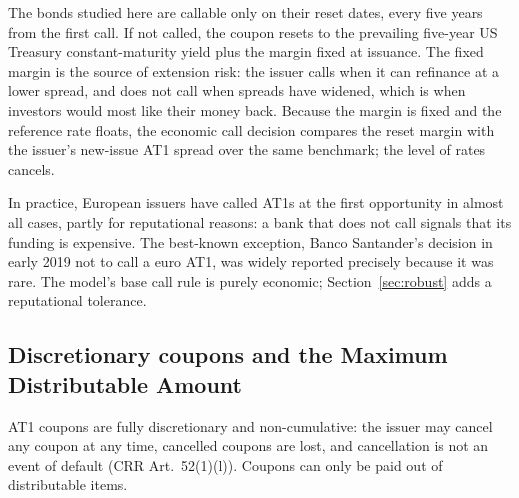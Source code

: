 The bonds studied here are callable only on their reset dates, every five years from
the first call. If not called, the coupon resets to the prevailing five-year US
Treasury constant-maturity yield plus the margin fixed at issuance. The fixed margin is
the source of extension risk: the issuer calls when it can refinance at a lower spread,
and does not call when spreads have widened, which is when investors would most like
their money back. Because the margin is fixed and the reference rate floats, the
economic call decision compares the reset margin with the issuer's new-issue AT1 spread
over the same benchmark; the level of rates cancels.

In practice, European issuers have called AT1s at the first opportunity in almost all
cases, partly for reputational reasons: a bank that does not call signals that its
funding is expensive. The best-known exception, Banco Santander's decision in early 2019
not to call a euro AT1, was widely reported precisely because it was rare. The model's
base call rule is purely economic; Section~\ref{sec:robust} adds a reputational
tolerance.

\subsection{Discretionary coupons and the Maximum Distributable Amount}

AT1 coupons are fully discretionary and non-cumulative: the issuer may cancel any
coupon at any time, cancelled coupons are lost, and cancellation is not an event of
default (CRR Art.~52(1)(l)). Coupons can only be paid out of distributable items.

